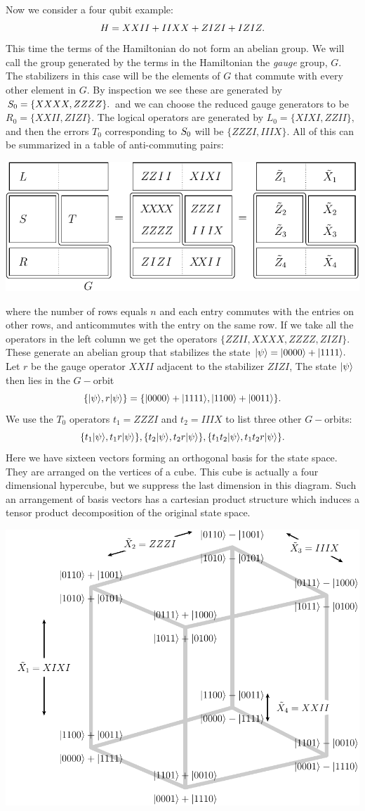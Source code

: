 \documentclass[12pt]{article}
\begin{document}
Now we consider a four qubit example:
$$
    H = XXII + IIXX + ZIZI + IZIZ.
$$
This time the terms of the Hamiltonian do not form
an abelian group.
We will call the group generated by the terms in the Hamiltonian
the \emph{gauge} group, $G$.
The stabilizers in this case will be the elements of $G$
that commute with every other element in $G.$
By inspection we see these are generated by $S_0=\{XXXX, ZZZZ\}.$
and we can choose the reduced gauge generators to be $R_0=\{XXII, ZIZI\}.$
The logical operators are generated by $L_0 = \{XIXI, ZZII\},$
and then the errors $T_0$ corresponding to $S_0$ will
be $\{ZZZI, IIIX\}.$
All of this can be summarized in a table of anti-commuting pairs:
\begin{center}
\includegraphics[]{pic-gauge4.pdf}
\end{center}
where the number of rows equals $n$ and each entry
commutes with the entries on other rows, and anticommutes
with the entry on the same row. 
If we take all the operators in the left column
we get the operators 
$\{ ZZII, XXXX, ZZZZ, ZIZI \}.$ 
These generate an abelian group 
that stabilizes the
state $|{\psi}\rangle = |{0000}\rangle+|{1111}\rangle.$
Let $r$ be the gauge operator $XXII$ adjacent to the 
stabilizer $ZIZI$,
The state $|{\psi}\rangle$ then lies in the $G-$orbit 
$$
\{|{\psi}\rangle, r|{\psi}\rangle\} = \{|{0000}\rangle+|{1111}\rangle, |{1100}\rangle+|{0011}\rangle\}.
$$
We use the $T_0$ operators $t_1=ZZZI$ and $t_2=IIIX$
to list three other $G-$orbits:
$$
\{t_1 |{\psi}\rangle, t_1 r|{\psi}\rangle\}, 
\{t_2 |{\psi}\rangle, t_2 r|{\psi}\rangle\}, 
\{t_1 t_2 |{\psi}\rangle, t_1 t_2 r|{\psi}\rangle\}.
$$
Here we have sixteen vectors forming an orthogonal basis for the state space.
They are arranged on the vertices of a cube. This cube is actually a four
dimensional hypercube, but we suppress the last dimension in
this diagram.
Such an arrangement of basis vectors has a cartesian product
structure which induces a tensor product decomposition of
the original state space.
\begin{center}
\includegraphics[width=0.7\columnwidth]{pic-operators.pdf}
\end{center}
\end{document}
